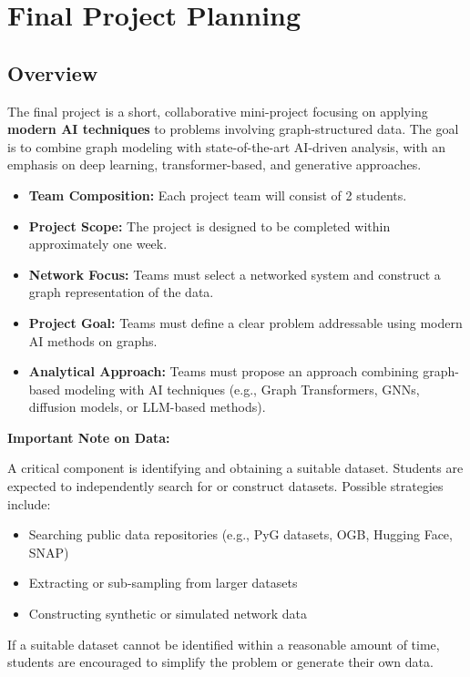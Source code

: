 \documentclass{article}
\begin{document}
\section{Final Project Planning}

\subsection*{Overview}

The final project is a short, collaborative mini-project focusing on applying \textbf{modern AI techniques} to problems involving graph-structured data. The goal is to combine graph modeling with state-of-the-art AI-driven analysis, with an emphasis on deep learning, transformer-based, and generative approaches.

\begin{itemize}[leftmargin=1.5em]
  \item \textbf{Team Composition:} Each project team will consist of 2 students.
  \item \textbf{Project Scope:} The project is designed to be completed within approximately one week.
  \item \textbf{Network Focus:} Teams must select a networked system and construct a graph representation of the data.
  \item \textbf{Project Goal:} Teams must define a clear problem addressable using modern AI methods on graphs.
  \item \textbf{Analytical Approach:} Teams must propose an approach combining graph-based modeling with AI techniques (e.g., Graph Transformers, GNNs, diffusion models, or LLM-based methods).
\end{itemize}

\vspace{0.5em}

\noindent\textbf{Important Note on Data:}

A critical component is identifying and obtaining a suitable dataset. Students are expected to independently search for or construct datasets. Possible strategies include:
\begin{itemize}[leftmargin=1.5em]
    \item Searching public data repositories (e.g., PyG datasets, OGB, Hugging Face, SNAP)
    \item Extracting or sub-sampling from larger datasets
    \item Constructing synthetic or simulated network data
\end{itemize}
If a suitable dataset cannot be identified within a reasonable amount of time, students are encouraged to simplify the problem or generate their own data.
\end{document}
